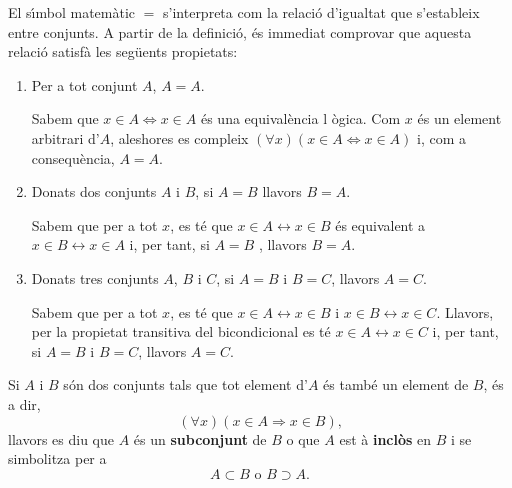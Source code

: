El s\'{\i}mbol matem\`{a}tic $=$ s'interpreta com la relaci\'{o} d'igualtat
que s'estableix entre conjunts. A partir de la definici\'{o}, \'{e}s
immediat comprovar que aquesta relaci\'{o} satisf\`{a} les seg\"{u}ents
propietats:

\begin{enumerate}
\item Per a tot conjunt $A$, $A=A$.

\begin{prova}
Sabem que $x\in A\Longleftrightarrow x\in A$ \'{e}s una equival\`{e}ncia l%
\`{o}gica. Com $x$ \'{e}s un element arbitrari d'$A$, aleshores es compleix $%
\left( \forall x\right) \left( x\in A\Longleftrightarrow x\in A\right) $ i,
com a consequ\`{e}ncia, $A=A$.
\end{prova}

\item Donats dos conjunts $A$ i $B$, si $A=B$ llavors $B=A$.

\begin{prova}
Sabem que per a tot $x$, es t\'{e} que $x\in A\longleftrightarrow x\in B$
\'{e}s equivalent a $x\in B\longleftrightarrow x\in A$ i, per tant, si $A=B$%
, llavors $B=A$.
\end{prova}

\item Donats tres conjunts $A$, $B$ i $C$, si $A=B$ i $B=C$, llavors $A=C$.

\begin{prova}
Sabem que per a tot $x$, es t\'{e} que $x\in A\longleftrightarrow x\in B$ i $%
x\in B\longleftrightarrow x\in C$. Llavors, per la propietat transitiva del
bicondicional es t\'{e} $x\in A\longleftrightarrow x\in C$ i, per tant, si $%
A=B$ i $B=C$, llavors $A=C$.
\end{prova}
\end{enumerate}

\bigskip

Si $A$ i $B$ s\'{o}n dos conjunts tals que tot element d'$A$ \'{e}s tamb\'{e}
un element de $B$, \'{e}s a dir,
\begin{equation*}
\left( \forall x\right) \left( x\in A\Longrightarrow x\in B\right) \text{,}
\end{equation*}
llavors es diu que $A$ \'{e}s un \textbf{subconjunt} de $B$ o que $A$ est%
\`{a} \textbf{incl\`{o}s} en $B$ i se simbolitza per a%
\begin{equation*}
A\subset B\text{ \ \ \ \ o \ \ \ }B\supset A\text{.}
\end{equation*}

